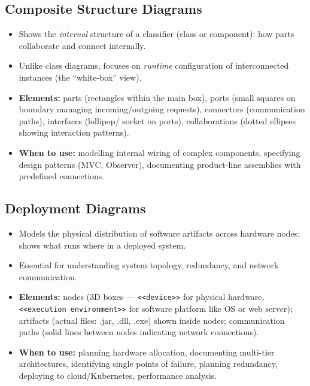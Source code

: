 \documentclass[hidelinks]{article}
\begin{document}
\subsection{Composite Structure Diagrams}
\begin{itemize}
  \item Shows the \emph{internal} structure of a classifier (class or component): how parts
        collaborate and connect internally.
  \item Unlike class diagrams, focuses on \emph{runtime} configuration of interconnected instances
        (the ``white-box'' view).
  \item \textbf{Elements:} parts (rectangles within the main box), ports (small squares on boundary
        managing incoming/outgoing requests), connectors (communication paths), interfaces (lollipop/
        socket on ports), collaborations (dotted ellipses showing interaction patterns).
  \item \textbf{When to use:} modelling internal wiring of complex components, specifying design
        patterns (MVC, Observer), documenting product-line assemblies with predefined connections.
\end{itemize}

\subsection{Deployment Diagrams}
\begin{itemize}
  \item Models the physical distribution of software artifacts across hardware nodes; shows what runs
        where in a deployed system.
  \item Essential for understanding system topology, redundancy, and network communication.
  \item \textbf{Elements:} nodes (3D boxes --- \texttt{<{}<device>{}>} for physical hardware,
        \texttt{<{}<execution environment>{}>} for software platform like OS or web server);
        artifacts (actual files: .jar, .dll, .exe) shown inside nodes; communication paths (solid
        lines between nodes indicating network connections).
  \item \textbf{When to use:} planning hardware allocation, documenting multi-tier architectures,
        identifying single points of failure, planning redundancy, deploying to cloud/Kubernetes,
        performance analysis.
\end{itemize}

\end{document}
